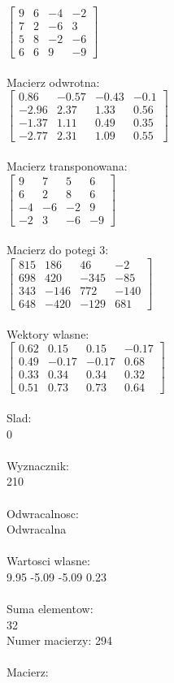 \documentclass[a4paper,12pt]{article}
\begin{document}
$\begin{bmatrix} 9&6&-4&-2\\7&2&-6&3\\5&8&-2&-6\\6&6&9&-9 \end{bmatrix}$
\\
\\
Macierz odwrotna:\\

$\begin{bmatrix} 0.86&-0.57&-0.43&-0.1\\-2.96&2.37&1.33&0.56\\-1.37&1.11&0.49&0.35\\-2.77&2.31&1.09&0.55 \end{bmatrix}$
\\
\\
Macierz transponowana:\\

$\begin{bmatrix} 9&7&5&6\\6&2&8&6\\-4&-6&-2&9\\-2&3&-6&-9 \end{bmatrix}$
\\
\\
Macierz do potegi 3:\\

$\begin{bmatrix} 815&186&46&-2\\698&420&-345&-85\\343&-146&772&-140\\648&-420&-129&681 \end{bmatrix}$
\\
\\
Wektory wlasne:\\

$\begin{bmatrix} 0.62&0.15&0.15&-0.17\\0.49&-0.17&-0.17&0.68\\0.33&0.34&0.34&0.32\\0.51&0.73&0.73&0.64 \end{bmatrix}$
\\
\\
Slad:\\
0
\\
\\
Wyznacznik:\\
210
\\
\\
Odwracalnosc:\\
Odwracalna
\\
\\
Wartosci wlasne:\\
9.95 -5.09 -5.09 0.23
\\
\\
Suma elementow:\\
32
\\
\newpage
Numer macierzy:
294
\\
\\
Macierz:\\
\end{document}
